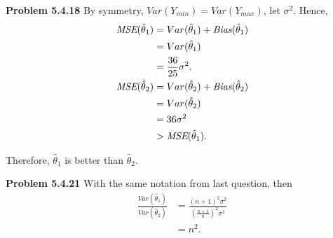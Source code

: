 \documentclass{article}
\begin{document}
\textbf{Problem 5.4.18}
By symmetry, $Var(Y_{min}) = Var(Y_{max})$, let $\sigma^2$. Hence, 
\begin{align}
    \emph{MSE}(\hat{\theta}_1) & = Var(\hat{\theta}_1) + \emph{Bias}(\hat{\theta}_1) \nonumber \\ 
    & = Var(\hat{\theta}_1) \nonumber \\
    & = \frac{36}{25}\sigma^2. \nonumber \\
    \emph{MSE}(\hat{\theta}_2) & = Var(\hat{\theta}_2) + \emph{Bias}(\hat{\theta}_2) \nonumber \\
    & = Var(\hat{\theta}_2) \nonumber \\
    & = 36\sigma^2 \nonumber \\
    & > \emph{MSE}(\hat{\theta}_1). \nonumber
\end{align}

Therefore, $\hat{\theta}_1$ is better than $\hat{\theta}_2$.
\bigbreak


\textbf{Problem 5.4.21}
With the same notation from last question, then
\begin{align}
    \frac{Var(\hat{\theta}_1)}{Var(\hat{\theta}_2)} & = \frac{(n+1)^2\sigma^2}{\left(\frac{n+1}{n}\right)^2\sigma^2}  \nonumber \\
    & = n^2. \nonumber
\end{align}
\bigbreak
\end{document}
